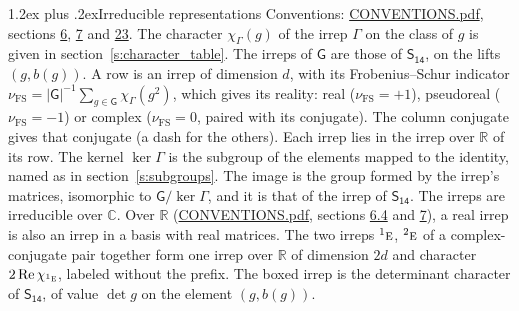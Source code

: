 \documentclass[10pt,a4paper]{article}
\makeatletter
\renewcommand\section{\@startsection{section}{1}{\z@}{-3ex plus -1ex minus -.2ex}%
  {1.2ex plus .2ex}{\normalfont\large\sffamily\bfseries\color{parttitle}}}
\numberwithin{equation}{section}
\newcommand{\grp}[1]{\mathsf{#1}}
\newcommand{\irr}[1]{\text{\normalfont\scshape #1}}
\newcommand{\conjpair}[1]{{}^{#1}}
\newcommand{\irchar}[1]{\chi_{#1}}
\newcommand{\fsind}{\nu_{\mathrm{FS}}}
\makeatother
\begin{document}
\section{Irreducible representations}\label{s:irreps}
Conventions: \href{../../CONVENTIONS.pdf}{CONVENTIONS.pdf}, sections \href{../../../rotation/CONVENTIONS.pdf\#conv.6}{6}, \href{../../../rotation/CONVENTIONS.pdf\#conv.7}{7} and \href{../../CONVENTIONS.pdf\#conv.23}{23}.
\leavevmode\label{n:function.character}\label{n:irrep.Gamma}The character $\irchar{\Gamma}(g)$ of the irrep $\Gamma$ on the class of $g$ is given in section~\ref{s:character_table}. The irreps of $\grp{G}$ are those of \href{../../../rotation/data/pdf/S14.pdf}{$\grp{S_{14}}$}, on the lifts $(g, b(g))$.
\leavevmode\label{n:index.dimension}\label{n:index.frobenius}\label{n:head.irrep}\label{n:head.reality}A row is an irrep of dimension $d$, with its Frobenius--Schur indicator $\fsind = |\grp{G}|^{-1}\allowbreak\sum_{g\in\grp{G}}\irchar{\Gamma}(g^2)$, which gives its reality: real ($\fsind = +1$), pseudoreal ($\fsind = -1$) or complex ($\fsind = 0$, paired with its conjugate). \label{n:head.conjugate}The column conjugate gives that conjugate (a dash for the others). \label{n:head.over.real}Each irrep lies in the irrep over $\mathbb{R}$ of its row. \label{n:head.kernel}The kernel $\ker\Gamma$ is the subgroup of the elements mapped to the identity, named as in section~\ref{s:subgroups}. \label{n:head.image}The image is the group formed by the irrep's matrices, isomorphic to $\grp{G}/\ker\Gamma$, and it is that of the irrep of \href{../../../rotation/data/pdf/S14.pdf}{$\grp{S_{14}}$}. The irreps are irreducible over $\mathbb{C}$. Over $\mathbb{R}$ (\href{../../CONVENTIONS.pdf}{CONVENTIONS.pdf}, sections \href{../../../rotation/CONVENTIONS.pdf\#conv.6.4}{6.4} and \href{../../../rotation/CONVENTIONS.pdf\#conv.7}{7}), a real irrep is also an irrep in a basis with real matrices. The two irreps $\conjpair{1}\irr{e}$, $\conjpair{2}\irr{e}$ of a complex-conjugate pair together form one irrep over $\mathbb{R}$ of dimension $2d$ and character $2\operatorname{Re}\irchar{\conjpair{1}\irr{e}}$, labeled without the prefix. \label{n:mark.determinant}The boxed irrep is the determinant character of \href{../../../rotation/data/pdf/S14.pdf}{$\grp{S_{14}}$}, of value $\det g$ on the element $(g, b(g))$.
\setlength{\emergencystretch}{2em}\par\setlength{\emergencystretch}{0pt}
\end{document}
